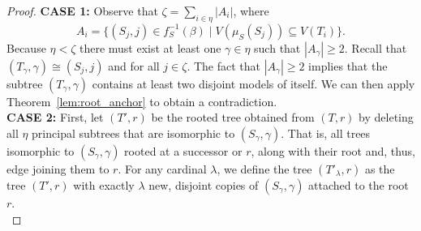 \documentclass[10pt,a4paper]{amsart}
\begin{document}
\begin{proof}

\noindent
{\bf CASE 1:}
Observe that $\zeta = \sum_{i \in \eta} |A_i|$, where$$A_i = \{(S_j,j) \in f_S^{-1}(\beta) \mid V(\mu_S(S_j)) \subseteq V(T_i)\}.$$Because $\eta < \zeta$ there must exist at least one $\gamma \in \eta$ such that $|A_\gamma| \geq 2$. Recall that $(T_\gamma, \gamma) \cong (S_j, j)$ and for all $j \in \zeta$. The fact that $|A_\gamma| \geq 2$ implies that the subtree $(T_\gamma, \gamma)$ contains at least two disjoint models of itself. We can then apply Theorem~\ref{lem:root_anchor} to obtain a contradiction.\\


\noindent
{\bf CASE 2:} First, let $(T', r)$ be the rooted tree obtained from $(T, r)$ by deleting all $\eta$ principal subtrees that are isomorphic to $(S_\gamma, \gamma)$. That is, all trees isomorphic to $(S_\gamma, \gamma)$ rooted at a successor or $r$, along with their root and, thus, edge joining them to $r$. For any cardinal $\lambda$, we define the tree $(T'_\lambda, r)$ as the tree $(T', r)$ with exactly $\lambda$ new, disjoint copies of $(S_\gamma, \gamma)$ attached to the root $r$.\\


\end{proof}
\end{document}
